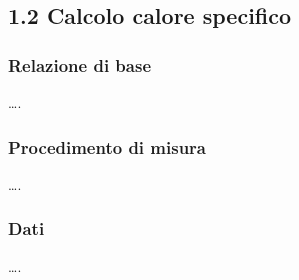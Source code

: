 \documentclass[11pt]{article}
\begin{document}
    \hypertarget{calcolo-calore-specifico}{%
\subsection{1.2 Calcolo calore
specifico}\label{calcolo-calore-specifico}}

    \hypertarget{relazione-di-base}{%
\subsubsection{Relazione di base}\label{relazione-di-base}}

\ldots{}.

\hypertarget{procedimento-di-misura}{%
\subsubsection{Procedimento di misura}\label{procedimento-di-misura}}

\ldots{}.

\hypertarget{dati}{%
\subsubsection{Dati}\label{dati}}

\ldots{}.
\end{document}
